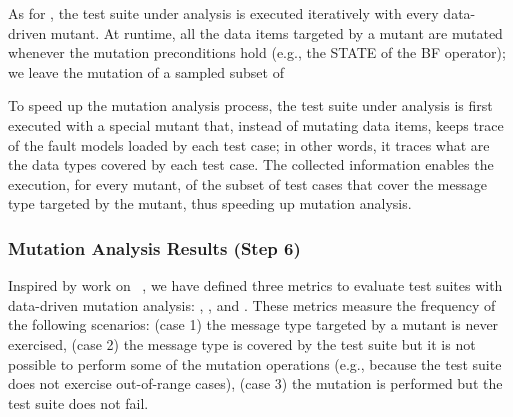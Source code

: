 As for , the test suite under analysis is executed iteratively with every data-driven mutant.
At runtime, all the data items targeted by a mutant are mutated whenever the mutation preconditions hold (e.g., the STATE of the BF operator); we leave the mutation of a sampled subset of 

To speed up the mutation analysis process, the test suite under analysis is first executed with a special mutant that, instead of mutating data items, keeps trace of the fault models loaded by each test case; in other words, it traces what are the data types covered by each test case. The collected information enables the execution, for every mutant, of the subset of test cases that cover the
message type
targeted by the mutant, thus speeding up mutation analysis.


\subsubsection{Mutation Analysis Results (Step 6)}
\label{sec:mutationAnalysisResults}

Inspired by work on ~\cite{Offutt2006}, we have defined three metrics to evaluate test suites with data-driven mutation analysis: , , and .
These metrics measure the frequency of the following scenarios: (case 1) the message type targeted by a mutant is never exercised, (case 2) the message type is covered by the test suite but it is not possible to perform some of the mutation operations (e.g., because the test suite does not exercise out-of-range cases), (case 3) the mutation is performed but the test suite does not fail.

